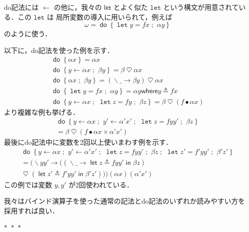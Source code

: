 \documentclass[a5paper,twoside,fleqn]{jsbook}
\newcommand{\Langle}{\langle\!\langle}
\newcommand{\Rangle}{\rangle\!\rangle}
\newcommand{\separator}{\begin{center}$*$~$*$~$*$\end{center}}
\newcommand{\mKeyword}[1]{\mathsf{#1}} %
\newcommand{\mVarKeyword}[1]{\texttt{#1}} %
\newcommand{\mDoKeyword}{\mKeyword{do}}
\newcommand{\mDoLetKeyword}{\mVarKeyword{let}}
\newcommand{\mInKeyword}{\mKeyword{in}}
\newcommand{\mLetKeyword}{\mKeyword{let}}
\newcommand{\mWhereKeyword}{\mKeyword{where}}
\DeclareMathOperator{\mDoKW}{\mDoKeyword}
\DeclareMathOperator{\mInKW}{\mInKeyword} %
\DeclareMathOperator{\mLetKW}{\mLetKeyword} %
\newcommand{\mAnyParam}{\_}
\DeclareMathOperator{\mAppMap}{\times}
\DeclareMathOperator{\mBind}{\heartsuit}
\DeclareMathOperator{\mDoEq}{\leftarrow}
\DeclareMathOperator{\mDoLetEq}{\mVarKeyword{=}}
\DeclareMathOperator{\mDoNext}{;\;}%
\DeclareMathOperator{\mLambda}{\backslash}
\DeclareMathOperator{\mLambdaArrow}{\rightarrow}
\DeclareMathOperator{\mLetEq}{\triangleq}
\DeclareMathOperator{\mMap}{\bullet}
\newcommand{\mFuncWith}[1]{\Langle#1\Rangle}
\newcommand{\mDo}[1]{\mDoKW\left\{#1\right\}}
\newcommand{\mDoLet}[2]{\mathop{\mDoLetKeyword}#1\mDoLetEq#2}
\newcommand{\mLambdaExp}[2]{\mLambda{#1}\mLambdaArrow{#2}}
\newcommand{\mLetIn}[3]{\mLetKW#1\mLetEq#2\mInKW{#3}}
\newcommand{\mWhereIs}[2]{\mathbin{\mWhereKeyword}#1\mLetEq#2}
\begin{document}
do記法には $\mDoEq$ の他に，我々の $\mLetKeyword$ とよく似た
$\mDoLetKeyword$ という構文が用意されている．この $\mDoLetKeyword$ は
局所変数の導入に用いられて，例えば
\begin{equation}
\omega=\mDo{\mDoLet{y}{fx}\mDoNext\alpha y}
\end{equation}
のように使う．

以下に，do記法を使った例を示す．
\begin{gather}
\mDo{\alpha x}=\alpha x\\
\mDo{y\mDoEq\alpha x\mDoNext\beta y}=\beta\mBind\alpha x\\
\mDo{\alpha x\mDoNext\beta y}=(\mLambdaExp{\mAnyParam}{\beta y})\mBind \alpha x\label{eq:do-alpha-beta}\\
\mDo{\mDoLet{y}{fx}\mDoNext\alpha y}=\alpha y\mWhereIs{y}{fx}\\
\mDo{y\mDoEq\alpha x\mDoNext\mDoLet{z}{fy}\mDoNext\beta z}
=\beta\mBind{}(f\mMap\alpha x)
\end{gather}
より複雑な例も挙げる．
\begin{multline}
\mDo{y\mDoEq\alpha x\mDoNext y'\mDoEq\alpha'x'\mDoNext\mDoLet{z}{fyy'}
\mDoNext\beta z}\\
=\beta\mBind{}(f\mMap\alpha x\mAppMap\alpha'x')
\end{multline}
最後にdo記法中に変数を2回以上使いまわす例を示す．
\begin{multline}
\mDo{y\mDoEq\alpha x\mDoNext y'\mDoEq\alpha'x'\mDoNext\mDoLet{z}{fyy'}\mDoNext\beta z\mDoNext\mDoLet{z'}{f'yy'}\mDoNext\beta'z'}\\
=(\mLambda yy'\mLambdaArrow{}((\mLambdaExp{\mAnyParam}{\mLetIn{z}{fyy'}{\beta z}})\\
\mBind{}(\mLetIn{z'}{f'yy'}{\beta'z'}))) (\alpha x)(\alpha'x')
\end{multline}
この例では変数 $y,y'$ が2回使われている．


我々はバインド演算子を使った通常の記法とdo記法のいずれか読みやすい方を採用すれば良い．



\separator
\end{document}
